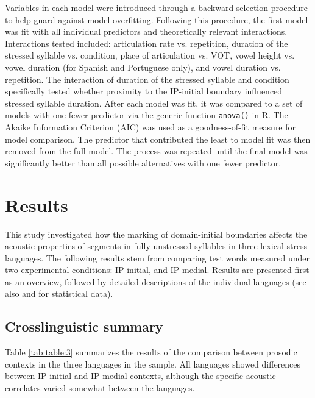 \documentclass[output=paper]{langscibook}
\begin{document}
Variables in each model were introduced through a backward selection procedure to help guard against model overfitting. Following this procedure, the first model was fit with all individual predictors and theoretically relevant interactions. Interactions tested included: articulation rate vs. repetition, duration of the stressed syllable vs. condition, place of articulation vs. VOT, vowel height vs. vowel duration (for Spanish and Portuguese only), and vowel duration vs. repetition. The interaction of duration of the stressed syllable and condition specifically tested whether proximity to the IP-initial boundary influenced stressed syllable duration.
After each model was fit, it was compared to a set of models with one fewer predictor via the generic function \texttt{anova()} in R. The Akaike Information Criterion (AIC) was used as a goodness-of-fit measure for model comparison. The predictor that contributed the least to model fit was then removed from the full model. The process was repeated until the final model was significantly better than all possible alternatives with one fewer predictor. 


\section{Results}\label{Results}
This study investigated how the marking of domain-initial boundaries affects the acoustic properties of segments in fully unstressed syllables in three lexical stress languages. The following results stem from comparing test words measured under two experimental conditions: IP-initial, and IP-medial. Results are presented first as an overview, followed by detailed descriptions of the individual languages (see also  and  for statistical data).

\subsection{Crosslinguistic summary}
Table \ref{tab:table:3} summarizes the results of the comparison between prosodic contexts in the three languages in the sample. All languages showed differences between IP-initial and IP-medial contexts, although the specific acoustic correlates varied somewhat between the languages.\largerpage 
\end{document}

